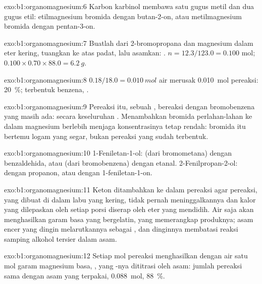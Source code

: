 \begin{solution}{exo:b1:organomagnesium:6}
Karbon karbinol membawa satu gugus metil dan dua gugus etil:
etilmagnesium bromida dengan butan-2-on, atau metilmagnesium bromida
dengan pentan-3-on.
\end{solution}

\begin{solution}{exo:b1:organomagnesium:7}
Buatlah  dari 2-bromopropana dan magnesium dalam eter
kering, tuangkan ke atas  padat, lalu asamkan: .
$n = 12.3/123.0 = 0.100$ mol;
$0.100 \times 0.70 \times 88.0 = \qty{6.2}{g}$.
\end{solution}

\begin{solution}{exo:b1:organomagnesium:8}
$0.18/18.0 = \qty{0.010}{mol}$ air merusak \qty{0.010}{mol} pereaksi:
\qty{20}{\percent}; terbentuk benzena, .
\end{solution}

\begin{solution}{exo:b1:organomagnesium:9}
Pereaksi itu, sebuah , bereaksi dengan bromobenzena yang masih
ada: secara keseluruhan .
Menambahkan bromida perlahan-lahan ke dalam magnesium berlebih menjaga
konsentrasinya tetap rendah: bromida itu bertemu logam yang segar,
bukan pereaksi yang sudah terbentuk.
\end{solution}

\begin{solution}{exo:b1:organomagnesium:10}
1-Feniletan-1-ol:  (dari bromometana) dengan benzaldehida,
atau  (dari bromobenzena) dengan etanal.
2-Fenilpropan-2-ol:  dengan propanon, atau 
dengan 1-feniletan-1-on.
\end{solution}

\begin{solution}{exo:b1:organomagnesium:11}
Keton ditambahkan ke dalam pereaksi agar pereaksi, yang dibuat di dalam
labu yang kering, tidak pernah meninggalkannya dan kalor yang dilepaskan
oleh setiap porsi diserap oleh eter yang mendidih. Air saja akan
menghasilkan garam basa  yang bergelatin, yang memerangkap
produknya; asam encer yang dingin melarutkannya sebagai , dan
dinginnya membatasi reaksi samping alkohol tersier dalam asam.
\end{solution}

\begin{solution}{exo:b1:organomagnesium:12}
Setiap mol pereaksi menghasilkan dengan air satu mol garam magnesium
basa, , yang -nya dititrasi oleh
asam: jumlah pereaksi sama dengan asam yang terpakai, \qty{0.088}{mol},
 \qty{88}{\percent}.
\end{solution}

